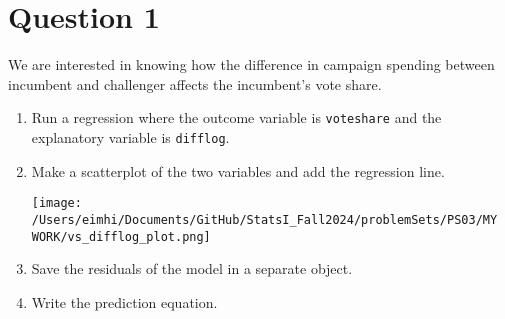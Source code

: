 \documentclass[12pt,letterpaper]{article}
\begin{document}
\section*{Question 1}
\vspace{.25cm}
\noindent We are interested in knowing how the difference in campaign spending between incumbent and challenger affects the incumbent's vote share. 
	\begin{enumerate}
		\item Run a regression where the outcome variable is \texttt{voteshare} and the explanatory variable is \texttt{difflog}.	\vspace{1cm}
		
		  
		
		\vspace{2cm}
		
		\item Make a scatterplot of the two variables and add the regression line.
		\vspace{1cm}
		
		  
		
		\vspace{1cm}
		
		 \texttt{[image: /Users/eimhi/Documents/GitHub/StatsI\_Fall2024/problemSets/PS03/MY WORK/vs\_difflog\_plot.png]}
		
		\vspace{1cm}
		
		\item Save the residuals of the model in a separate object.
		\vspace{1cm}
		
		  
		
		\vspace{1cm}
		
		\item Write the prediction equation.
			\vspace{1cm}
		
		  
		
		\vspace{1cm}
		
		
	\end{enumerate}
	
\end{document}
